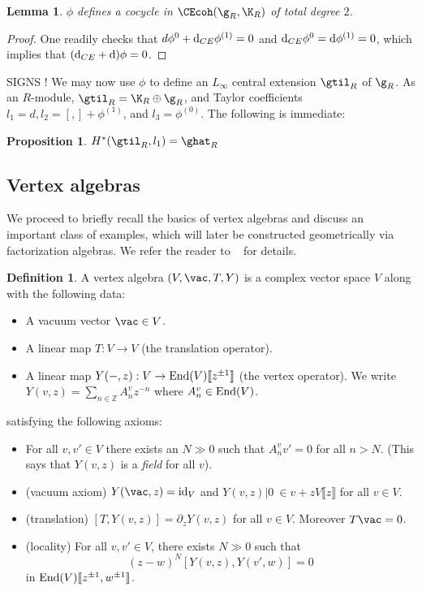 \documentclass[12pt]{amsart}
\newtheorem{prop}[theorem]{Proposition}
\newtheorem{lemma}[theorem]{Lemma}
\theoremstyle{definition}
\newtheorem{dfn}[theorem]{Definition}
\theoremstyle{remark}
\newcommand{\R}{R}
\def\d{{\rm d}}
\begin{document}
\begin{lemma}
$\phi$ defines a cocycle in $\CEcoh(\g_{\R}, \K_{\R}) $ of total degree $2$.
\end{lemma}
\begin{proof}
One readily checks that $d \phi^{0} + \d_{CE} \phi^{(1)} = 0 $ and $\d_{CE} \phi^{0} = \d \phi^{(1)} = 0$, which implies that $(\d_{CE} + \d) \phi = 0$.
\end{proof}

{\color{red} SIGNS !}
We may now use $\phi$ to define an $L_{\infty}$ central extension $\gtil_{\R}$ of $\g_{\R}$. As an $\R$-module, $ \gtil_{\R} = \K_{\R} \oplus \g_{\R} $, and Taylor coefficients $l_1 = d, l_2 = [,] + \phi^{(1)}$, and $l_3 = \phi^{(0)}$. The following is immediate:

\begin{prop}
$H^{*}(\gtil_{\R}, l_1) = \ghat_{\R}$
\end{prop} 

\subsection{Vertex algebras}

We proceed to briefly recall the basics of vertex algebras and discuss an important class of examples, which will later be constructed geometrically via factorization algebras. We refer the reader to ~\cite{FBZ, Kac} for details. 

\begin{dfn}
A vertex algebra $(V,\vac, T, Y)$ is a complex vector
space $V$ along with the following data:
\begin{itemize}
\item A vacuum vector $\vac \in V$.
\item A linear map $T : V \to V$ (the translation operator).
\item A linear map $Y(-,z) : V \to {\rm End}(V)\llbracket z^{\pm 1}
  \rrbracket$ (the vertex operator). We write $Y(v,z) = \sum_{n \in \mathbb{Z}} A_n^v z^{-n}$
  where $A_n^v \in {\rm End}(V)$. 
\end{itemize} 
satisfying the following axioms:
\begin{itemize}
\item For all $v,v' \in V$ there exists an $N \gg 0$ such that $A_n^v
  v' = 0$ for all $n > N$. (This says that $Y(v,z)$ is a {\it field}
  for all $v$). 
\item (vacuum axiom) $Y(\vac, z) = {\rm id}_V$ and
    $Y(v,z)  |0\> \in v + z V \llbracket z \rrbracket$ for all
    $v \in V$. 
\item (translation) $[T,Y(v,z)] = \partial_z Y(v,z)$ for all $v \in
  V$. Moreover $T \vac = 0$. 
\item (locality) For all $v,v' \in V$, there exists $N \gg 0$ such
  that 
\[
(z-w)^N[Y(v,z),Y(v',w)] = 0
\]
in ${\rm End}(V) \llbracket z^{\pm 1},w^{\pm 1}\rrbracket$. 
\end{itemize}
\end{dfn}
\end{document}
